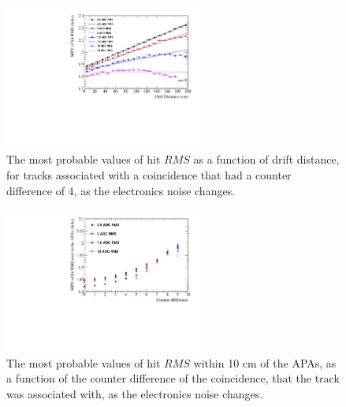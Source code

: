 \begin{figure}
  \centering
  \includegraphics[width=0.6\textwidth]{Canvas_CountDiff4_All_Positions_NoiseLevel}
  \caption[The drift distance dependence of diffusion in the 35 ton dataset and Monte Carlo for coincidences with a counter difference of 4, as the electronics noise changes]
          {The most probable values of hit $RMS$ as a function of drift distance, for tracks associated with a coincidence that had a counter difference of 4, as the electronics noise changes.}
  \label{fig:DiffNoiseStudy_CDiff4}
\end{figure}

\begin{figure}
  \centering
  \includegraphics[width=0.6\textwidth]{Canvas_All_Angles_RMS0cm_NoiseLevel}
  \caption[The angular dependence of diffusion in the 35 ton dataset and Monte Carlo for hits within 10 cm of the APAs, as the electronics noise changes]
          {The most probable values of hit $RMS$ within 10 cm of the APAs, as a function of the counter difference of the coincidence, that the track was associated with, as the electronics noise changes.}
  \label{fig:DiffNoiseStudy_RMS0cm}
\end{figure}

